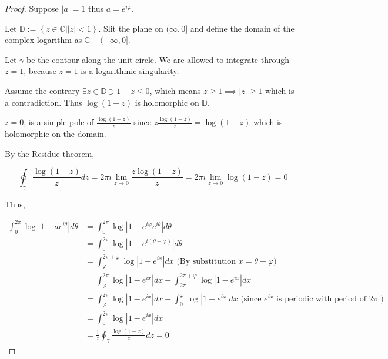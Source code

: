 \documentclass{article}
\newcommand{\C}{\mathbb{C}}
\newcommand{\abs}[1]{\left\lvert #1\right\rvert}
\begin{document}
\begin{proof}
    Suppose $|a| = 1$ thus $a = e^{i \varphi}$. 

    Let $\mathbb{D} := \left\{ z \in \C | |z| < 1 \right\}$. Slit the plane on $(\infty, 0]$ and define the domain of the complex logarithm as $\C - (-\infty , 0]$.    

    Let $\gamma$ be the contour along the unit circle. We are allowed to integrate through $z = 1$, because $z = 1$ is a logarithmic singularity.  

    Assume the contrary $\exists z \in \mathbb{D} \ni 1 - z \leq 0$, which means $z \geq 1 \implies \abs{z} \geq 1$ which is a contradiction. Thus $\log(1 - z)$ is holomorphic on $\mathbb{D}$.
    
    
    $z = 0$, is a simple pole of $\frac{\log(1 - z)}{z}$ since $z\frac{\log(1 - z)}{z} = \log(1 - z)$ which is holomorphic on the domain. 
    
    By the Residue theorem, 

    \begin{equation*}
        \oint_\gamma \frac{\log(1 - z)}{z} dz = 2 \pi i \lim_{z \to 0} \frac{z \log(1 - z)}{z} = 2 \pi i \lim_{z \to 0} \log(1 - z) = 0
    \end{equation*}

    Thus, 
    
    \begin{align*}
        \int_{0}^{2 \pi} \log \abs{1 - a e^{i \theta}} d \theta
        &= \int_{0}^{2 \pi} \log \abs{1 - e^{i \varphi} e^{i \theta}} d \theta \\
        &=\int_{0}^{2 \pi} \log \abs{1 - e^{i(\theta + \varphi)}} d \theta \\
        &= \int_{\varphi}^{2 \pi + \varphi} \log \abs{1 - e^{ix}} d x \text{ (By substitution $x = \theta + \varphi$)} \\
        &= \int_{\varphi}^{2 \pi} \log \abs{1 - e^{ix}} d x  + \int_{2\pi}^{2 \pi + \varphi} \log \abs{1 - e^{ix}} d x \\
        &= \int_{\varphi}^{2 \pi} \log \abs{1 - e^{ix}} d x  + \int_{0}^{\varphi} \log \abs{1 - e^{ix}} d x \text{ (since $e^{ix}$ is periodic with period of $2 \pi$ )} \\
        &= \int_{0}^{2 \pi} \log \abs{1 - e^{ix}} d x \\
        &= \frac{1}{z} \oint_\gamma \frac{\log(1 - z)}{z} dz = 0
    \end{align*} 
\end{proof}
\end{document}
